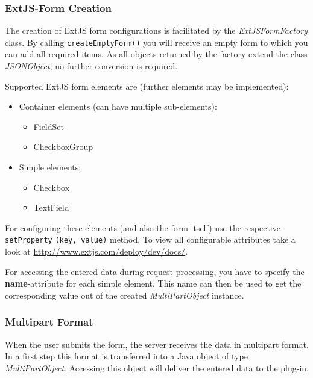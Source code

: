 		
		\subsubsection{ExtJS-Form Creation}
		\label{extjs}
		The creation of ExtJS form configurations is facilitated by the
\textit{ExtJSFormFactory} class. By calling 
		\verb!createEmptyForm()! you will receive an empty form to which
you can add all required items. As all objects returned by the factory extend the class \textit{JSONObject}, no further conversion is required.
		
		Supported ExtJS form elements are (further elements may be implemented):
		\begin{itemize}
			\item Container elements (can have multiple
sub-elements):
			\begin{itemize}
				\item FieldSet
				\item CheckboxGroup
			\end{itemize}
			\item Simple elements:
			\begin{itemize}
				\item Checkbox
				\item TextField
			\end{itemize}
		\end{itemize}
		
		For configuring these elements (and also the form itself) use
the respective \verb!setProperty! \verb!(key, value)! method. To view all
configurable attributes take a look at
\url{http://www.extjs.com/deploy/dev/docs/}.
		
		For accessing the entered data during request processing, you
have to specify the \textbf{name}-attribute for each simple element. This name
can then be used to get the corresponding value out of the created
\textit{MultiPartObject} instance.
			
		\subsubsection{Multipart Format}
		\label{multipart_format}
		When the user submits the form, the server receives the data in
multipart format. In a first step this format is transferred into a Java object
of type \textit{MultiPartObject}. Accessing this object will deliver the entered
data to the plug-in. 
		
